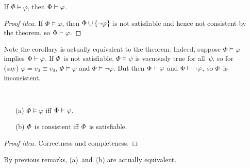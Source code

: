 \begin{cor}[Completeness]
If \(\Phi\models\varphi\), then \(\Phi\vdash\varphi\).
\end{cor}
\begin{proof}[Proof idea]
If \(\Phi\models\varphi\), then \(\Phi\cup\{\lnot\varphi\}\) is not satisfiable and hence not consistent by the theorem, so \(\Phi\vdash\varphi\).
\end{proof}
\begin{rmk}
Note the corollary is actually equivalent to the theorem. Indeed, suppose \(\Phi\models\varphi\) implies \(\Phi\vdash\varphi\). If \(\Phi\)~is not satisfiable, \(\Phi\models\psi\) is vacuously true for all~\(\psi\), so for (say) \(\varphi=v_0\equiv v_0\), \(\Phi\models\varphi\) and \(\Phi\models\lnot\varphi\). But then \(\Phi\vdash\varphi\) and \(\Phi\vdash\lnot\varphi\), so \(\Phi\)~is inconsistent.
\end{rmk}

\begin{thm}[Adequacy]
\ 
\begin{enumerate}[itemsep=0pt]
\item[(a)] \(\Phi\models\varphi\) iff \(\Phi\vdash\varphi\).
\item[(b)] \(\Phi\)~is consistent iff \(\Phi\)~is satisfiable.
\end{enumerate}
\end{thm}
\begin{proof}[Proof idea]
Correctness and completeness.
\end{proof}
\begin{rmk}
By previous remarks, (a)~and~(b) are actually equivalent.
\end{rmk}
